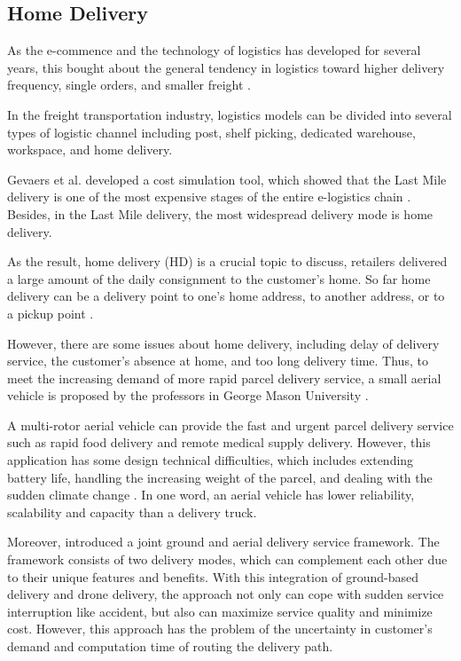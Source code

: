 \documentclass[12pt]{ksthesis}
\begin{document}
\begin{thesis}
{\section{Home Delivery}
As the e-commence and the technology of logistics has developed for several years, this bought about the general tendency in logistics toward higher delivery frequency, single orders, and smaller freight \cite{Visser2014}.

In the freight transportation industry, logistics models can be divided into several types of logistic channel including post, shelf picking, dedicated warehouse, workspace, and home delivery.

Gevaers et al. developed a cost simulation tool, which showed that the Last Mile delivery is one of the most expensive stages of the entire e-logistics chain \cite{Gevaers2014}. Besides, in the Last Mile delivery, the most widespread delivery mode is home delivery.

As the result, home delivery (HD) is a crucial topic to discuss, retailers delivered a large amount of the daily consignment to the customer’s home. So far home delivery can be a delivery point to one’s home address, to another address, or to a pickup point  \cite{Zhou2016}. 

However, there are some issues about home delivery, including delay of delivery service, the customer’s absence at home, and too long delivery time. Thus, to meet the increasing demand of more rapid parcel delivery service, a small aerial vehicle is proposed by the professors in George Mason University \cite{Ali2015}.

A multi-rotor aerial vehicle can provide the fast and urgent parcel delivery service such as rapid food delivery and remote medical supply delivery. However, this application has some design technical difficulties, which includes extending battery life, handling the increasing weight of the parcel, and dealing with the sudden climate change \cite{Ali2015}. In one word, an aerial vehicle has lower reliability, scalability and capacity than a delivery truck.

Moreover, \cite{Sawadsitang2018} introduced a joint ground and aerial delivery service framework. The framework consists of two delivery modes, which can complement each other due to their unique features and benefits. With this integration of ground-based delivery and drone delivery, the approach not only can cope with sudden service interruption like accident, but also can maximize service quality and minimize cost. However, this approach has the problem of the uncertainty in customer’s demand and computation time of routing the delivery path. 

}
\end{thesis}
\end{document}
